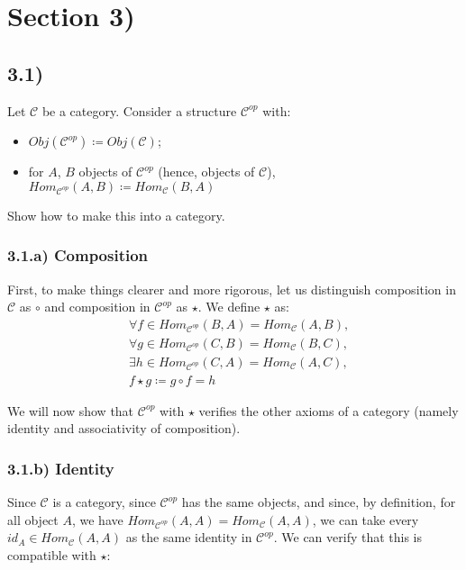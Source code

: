 \section*{Section 3)}

\subsection*{3.1)}

Let $\mathcal{C}$ be a category. Consider a structure $\mathcal{C}^{op}$ with:
\begin{itemize}
	\item $Obj(\mathcal{C}^{op}) \coloneqq Obj(\mathcal{C})$;
	\item for $A$, $B$ objects of $\mathcal{C}^{op}$ (hence, objects of $\mathcal{C}$), $Hom_{\mathcal{C}^{op}} (A, B) \coloneqq Hom_{\mathcal{C}} (B, A)$
\end{itemize}
Show how to make this into a category.

\subsubsection*{3.1.a) Composition}

First, to make things clearer and more rigorous, let us distinguish composition in $\mathcal{C}$ as $\circ$ and composition in $\mathcal{C}^{op}$ as $\star$. We define $\star$ as:
$$
\begin{aligned}
	& \forall f \in Hom_{\mathcal{C}^{op}} (B, A) = Hom_{\mathcal{C}} (A, B), \\
	& \forall g \in Hom_{\mathcal{C}^{op}} (C, B) = Hom_{\mathcal{C}} (B, C), \\
	& \exists h \in Hom_{\mathcal{C}^{op}} (C, A) = Hom_{\mathcal{C}} (A, C), \\
	& f \star g \coloneqq g \circ f = h
\end{aligned}
$$

We will now show that $\mathcal{C}^{op}$ with $\star$ verifies the other axioms of a category (namely identity and associativity of composition).

\subsubsection*{3.1.b) Identity}

Since $\mathcal{C}$ is a category, since $\mathcal{C}^{op}$ has the same objects, and since, by definition, for all object $A$, we have $Hom_{\mathcal{C}^{op}} (A, A) = Hom_{\mathcal{C}} (A, A)$, we can take every $id_A \in Hom_{\mathcal{C}}(A, A)$ as the same identity in $\mathcal{C}^{op}$. We can verify that this is compatible with $\star$:

